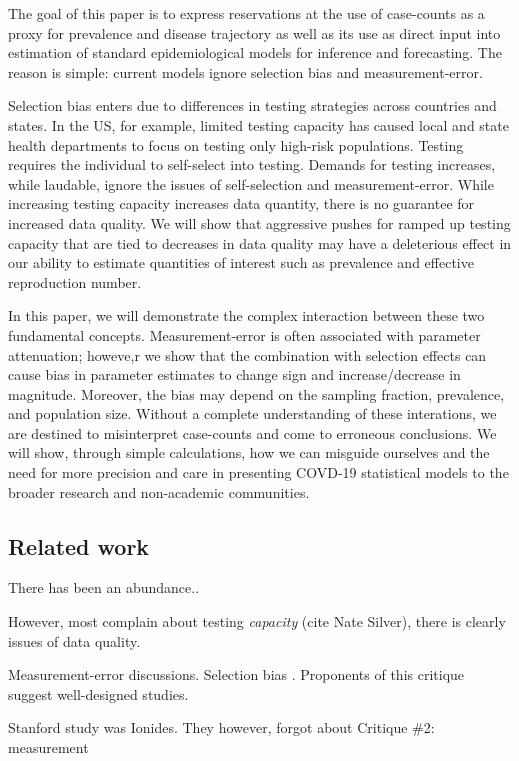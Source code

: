 \documentclass[11pt]{article}
\numberwithin{equation}{section}
\theoremstyle{plain}
\begin{document}
The goal of this paper is to express reservations at the use of case-counts as a proxy for prevalence and disease trajectory as well as its use as direct input into estimation of standard epidemiological models for inference and forecasting.  The reason is simple: current models ignore selection bias and measurement-error.

Selection bias enters due to differences in testing strategies across countries and states.  In the US, for example, limited testing capacity has caused local and state health departments to focus on testing only  high-risk populations.  Testing requires the individual to self-select into testing.  Demands for testing increases, while laudable, ignore the issues of self-selection and measurement-error. While increasing testing capacity increases data quantity, there is no guarantee for increased data quality.  We will show that aggressive pushes for ramped up testing capacity that are tied to decreases in data quality may have a deleterious effect in our ability to estimate quantities of interest such as prevalence and effective reproduction number.

In this paper, we will demonstrate the complex interaction between these two fundamental concepts.  Measurement-error is often associated with parameter attenuation; howeve,r we show that the combination with selection effects can cause bias in parameter estimates to change sign and increase/decrease in magnitude.  Moreover, the bias may depend on the sampling fraction, prevalence, and population size.  Without a complete understanding of these interations, we are destined to misinterpret case-counts and come to erroneous conclusions.   We will show, through simple calculations, how we can misguide ourselves and the need for more precision and care in presenting COVD-19 statistical models to the broader research and non-academic communities.

\subsection{Related work}

There has been an abundance..

However, most complain about testing \emph{capacity} (cite Nate Silver), there is clearly issues of data quality.

Measurement-error discussions.
Selection bias . Proponents of this critique suggest well-designed studies.

Stanford study was Ionides.  They however, forgot about Critique \#2: measurement
\end{document}
